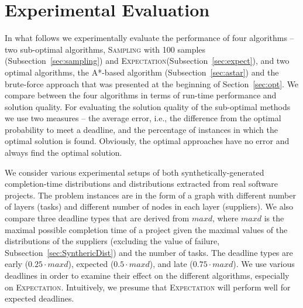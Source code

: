 \documentclass[letterpaper]{article}
\newcommand{\astar}{\textsc{A*}\xspace}
\newcommand{\sampling}{\textsc{Sampling}\xspace}
\newcommand{\expectation}{\textsc{Expectation}\xspace}
\begin{document}
\section{Experimental Evaluation}
\label{sec:exp}

In what follows we experimentally evaluate the performance of four algorithms -- two sub-optimal algorithms, \sampling with 100 samples (Subsection~\ref{sec:sampling}) and \expectation (Subsection~\ref{sec:expect}), and two optimal algorithms, the \astar-based algorithm (Subsection~\ref{sec:astar}) and the brute-force approach that was presented at the beginning of Section~\ref{sec:opt}.
We compare between the four algorithms in terms of run-time performance and solution quality. For evaluating the solution quality of the sub-optimal methods we use two measures -- the average error, i.e., the difference from the optimal probability to meet a deadline, and the percentage of instances in which the optimal solution is found. Obviously, the optimal approaches have no error and always find the optimal solution.

We consider various experimental setups of both synthetically-generated completion-time distributions and distributions extracted from real software projects. The problem instances are in the form of a graph with different number of layers (tasks) and different number of nodes in each layer (suppliers). We also compare three deadline types that are derived from $maxd$, where $maxd$ is the maximal possible completion time of a project given the maximal values of the distributions of the suppliers (excluding the value of failure, Subsection~\ref{sec:SynthericDist}) and the number of tasks. The deadline types are early ($0.25\cdot maxd$), expected ($0.5\cdot maxd$), and late ($0.75\cdot maxd$). We use various deadlines in order to examine their effect on the different algorithms, especially on \expectation. Intuitively, we presume that \expectation will perform well for expected deadlines.
\end{document}

